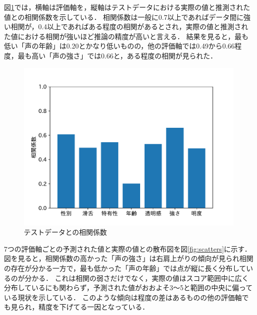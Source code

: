図\ref{tab:score_coor}では，横軸は評価軸を，縦軸はテストデータにおける実際の値と推測された値との相関係数を示している．
相関係数は一般に0.7以上であればデータ間に強い相関が，0.4以上であればある程度の相関があるとされ，実際の値と推測された値における相関が強いほど推論の精度が高いと言える．
結果を見ると，最も低い「声の年齢」は0.20とかなり低いものの，他の評価軸では0.49から0.66程度，最も高い「声の強さ」では0.66と，ある程度の相関が見られた．

\begin{figure}[htb]
  \centering
  \includegraphics[width=\linewidth]{fig/coorpdf.pdf}
  \caption{テストデータとの相関係数}
  \label{tab:score_coor}
\end{figure}

7つの評価軸ごとの予測された値と実際の値との散布図を図\ref{fig:scatters}に示す．
図を見ると，相関係数の高かった「声の強さ」は右肩上がりの傾向が見られ相関の存在が分かる一方で，最も低かった「声の年齢」では点が縦に長く分布しているのが分かる．
これは相関の弱さだけでなく，実際の値はスコア範囲中に広く分布しているにも関わらず，予測された値がおおよそ3〜5と範囲の中央に偏っている現状を示している．
このような傾向は程度の差はあるものの他の評価軸でも見られ，精度を下げてる一因となっている．

